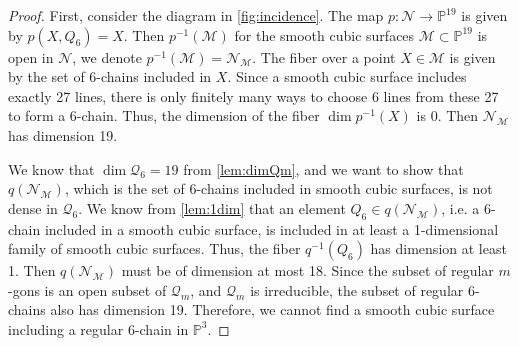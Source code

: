 
\begin{proof}
    First, consider the diagram in \cref{fig:incidence}. The map $p \colon \mathcal{N} \to \mathbb{P}^{19}$ is given by $p(X, Q_6) = X$. Then $p^{-1}(\mathcal{M})$ for the smooth cubic surfaces $\mathcal{M} \subset \mathbb{P}^{19}$ is open in $\mathcal{N}$, we denote $p^{-1}(\mathcal{M}) = \mathcal{N}_\mathcal{M}$. The fiber over a point $X \in \mathcal{M}$ is given by the set of 6-chains included in $X$. Since a smooth cubic surface includes exactly 27 lines, there is only finitely many ways to choose 6 lines from these 27 to form a 6-chain. Thus, the dimension of the fiber $\dim p^{-1}(X)$ is 0. Then $\mathcal{N}_\mathcal{M}$ has dimension 19. 

    We know that $\dim \mathcal{Q}_6 = 19$ from \cref{lem:dimQm}, and we want to show that $q(\mathcal{N}_\mathcal{M})$, which is the set of 6-chains included in smooth cubic surfaces, is not dense in $\mathcal{Q}_6$. We know from \cref{lem:1dim} that an element $Q_6 \in q(\mathcal{N}_\mathcal{M})$, i.e. a 6-chain included in a smooth cubic surface, is included in at least a 1-dimensional family of smooth cubic surfaces. Thus, the fiber $q^{-1}(Q_6)$ has dimension at least 1. Then $q(\mathcal{N}_\mathcal{M})$ must be of dimension at most 18. Since the subset of regular $m$-gons is an open subset of $\mathcal{Q}_m$, and $\mathcal{Q}_m$ is irreducible, the subset of regular 6-chains also has dimension 19. Therefore, we cannot find a smooth cubic surface including a regular 6-chain in $\mathbb{P}^3$.
\end{proof}

